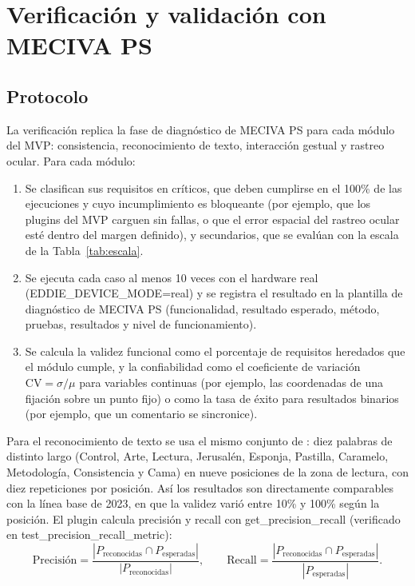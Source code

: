 \section{Verificación y validación con MECIVA PS}

\subsection{Protocolo}

La verificación replica la fase de diagnóstico de MECIVA PS \citep{ibaceta2023evaluacion} para cada módulo del MVP: consistencia, reconocimiento de texto, interacción gestual y rastreo ocular. Para cada módulo:

\begin{enumerate}
  \item Se clasifican sus requisitos en críticos, que deben cumplirse en el 100\% de las ejecuciones y cuyo incumplimiento es bloqueante (por ejemplo, que los plugins del MVP carguen sin fallas, o que el error espacial del rastreo ocular esté dentro del margen definido), y secundarios, que se evalúan con la escala de la Tabla~\ref{tab:escala}.
  \item Se ejecuta cada caso al menos 10 veces con el hardware real (EDDIE\_DEVICE\_MODE=real) y se registra el resultado en la plantilla de diagnóstico de MECIVA PS (funcionalidad, resultado esperado, método, pruebas, resultados y nivel de funcionamiento).
  \item Se calcula la validez funcional como el porcentaje de requisitos heredados que el módulo cumple, y la confiabilidad como el coeficiente de variación $\mathrm{CV}=\sigma/\mu$ para variables continuas (por ejemplo, las coordenadas de una fijación sobre un punto fijo) o como la tasa de éxito para resultados binarios (por ejemplo, que un comentario se sincronice).
\end{enumerate}

Para el reconocimiento de texto se usa el mismo conjunto de \citet{ibaceta2023evaluacion}: diez palabras de distinto largo (Control, Arte, Lectura, Jerusalén, Esponja, Pastilla, Caramelo, Metodología, Consistencia y Cama) en nueve posiciones de la zona de lectura, con diez repeticiones por posición. Así los resultados son directamente comparables con la línea base de 2023, en que la validez varió entre 10\% y 100\% según la posición. El plugin calcula precisión y recall con get\_precision\_recall (verificado en test\_precision\_recall\_metric):
\begin{equation}
\mathrm{Precisión}=\frac{|P_{\text{reconocidas}}\cap P_{\text{esperadas}}|}{|P_{\text{reconocidas}}|},\qquad
\mathrm{Recall}=\frac{|P_{\text{reconocidas}}\cap P_{\text{esperadas}}|}{|P_{\text{esperadas}}|}.
\end{equation}

